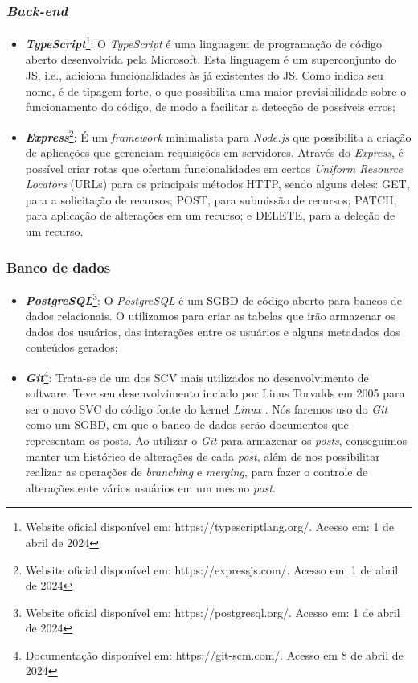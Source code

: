 \subsubsection{\textit{Back-end}}
\begin{itemize}
    \item \textbf{\textit{TypeScript}}\footnote{Website oficial disponível em: https://typescriptlang.org/. Acesso em: 1 de abril de 2024}: O \textit{TypeScript} é uma linguagem de programação de código aberto desenvolvida pela Microsoft. Esta linguagem é um superconjunto do JS, i.e., adiciona funcionalidades às já existentes do JS. Como indica seu nome, é de tipagem forte, o que possibilita uma maior previsibilidade sobre o funcionamento do código, de modo a facilitar a detecção de possíveis erros;
    \item \textbf{\textit{Express}}\footnote{Website oficial disponível em: https://expressjs.com/. Acesso em: 1 de abril de 2024}: É um \textit{framework} minimalista para \textit{Node.js} que possibilita a criação de aplicações que gerenciam requisições em servidores. Através do \textit{Express}, é possível criar rotas que ofertam funcionalidades em certos \textit{Uniform Resource Locators} (URLs) para os principais métodos HTTP, sendo alguns deles: GET, para a solicitação de recursos; POST, para submissão de recursos; PATCH, para aplicação de alterações em um recurso; e DELETE, para a deleção de um recurso.
\end{itemize}

\subsubsection{Banco de dados}
\begin{itemize}
    \item \textbf{\textit{PostgreSQL}}\footnote{Website oficial disponível em: https://postgresql.org/. Acesso em: 1 de abril de 2024}: O \textit{PostgreSQL} é um SGBD de código aberto para bancos de dados relacionais. O utilizamos para criar as tabelas que irão armazenar os dados dos usuários, das interações entre os usuários e alguns metadados dos conteúdos gerados;
    \item \textbf{\textit{Git}}\footnote{Documentação disponível em: https://git-scm.com/. Acesso em 8 de abril de 2024}: Trata-se de um dos SCV mais utilizados no desenvolvimento de software. Teve seu desenvolvimento inciado por Linus Torvalds em 2005 para ser o novo SVC do código fonte do kernel \textit{Linux} \cite{proGit}. Nós faremos uso do \textit{Git} como um SGBD, em que o banco de dados serão documentos que representam os posts. Ao utilizar o \textit{Git} para armazenar os \textit{posts}, conseguimos manter um histórico de alterações de cada \textit{post}, além de nos possibilitar realizar as operações de \textit{branching} e \textit{merging}, para fazer o controle de alterações ente vários usuários em um mesmo \textit{post}.
\end{itemize}

